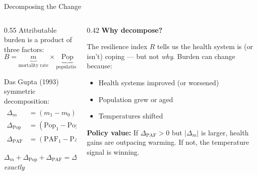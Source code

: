 \documentclass[aspectratio=169,10pt]{beamer}
\begin{document}
\begin{frame}{Decomposing the Change}
  \begin{columns}[T]
    \begin{column}{0.55\textwidth}
      Attributable burden is a product of three factors:
      \begin{equation*}
        B = \underbrace{m}_{\text{mortality rate}} \times \underbrace{\text{Pop}}_{\text{population}} \times \underbrace{\text{PAF}}_{\text{temperature}}
      \end{equation*}

      \vspace{0.2em}
      Das Gupta (1993) symmetric decomposition:
      \begin{align*}
        \Delta_m &= (m_1 - m_0) \cdot \frac{\text{Pop}_0 \!\cdot\! \text{PAF}_1 + \text{Pop}_1 \!\cdot\! \text{PAF}_0}{2} \\[0.2em]
        \Delta_{\text{Pop}} &= (\text{Pop}_1 - \text{Pop}_0) \cdot \frac{m_0 \!\cdot\! \text{PAF}_1 + m_1 \!\cdot\! \text{PAF}_0}{2} \\[0.2em]
        \Delta_{\text{PAF}} &= (\text{PAF}_1 - \text{PAF}_0) \cdot \frac{m_0 \!\cdot\! \text{Pop}_1 + m_1 \!\cdot\! \text{Pop}_0}{2}
      \end{align*}

      $\Delta_m + \Delta_{\text{Pop}} + \Delta_{\text{PAF}} = \Delta B$ \;\textit{exactly}
    \end{column}
    \begin{column}{0.42\textwidth}
      \textbf{Why decompose?}

      The resilience index $R$ tells us the health system is (or isn't) coping --- but not \emph{why}. Burden can change because:
      \begin{itemize}
        \item[$\Delta_m$:] Health systems improved (or worsened)
        \item[$\Delta_{\text{Pop}}$:] Population grew or aged
        \item[$\Delta_{\text{PAF}}$:] Temperatures shifted
      \end{itemize}

      \vspace{0.3em}
      \textbf{Policy value:} If $\Delta_{\text{PAF}} > 0$ but $|\Delta_m|$ is larger, health gains are outpacing warming. If not, the temperature signal is winning.
    \end{column}
  \end{columns}
\end{frame}
\end{document}
